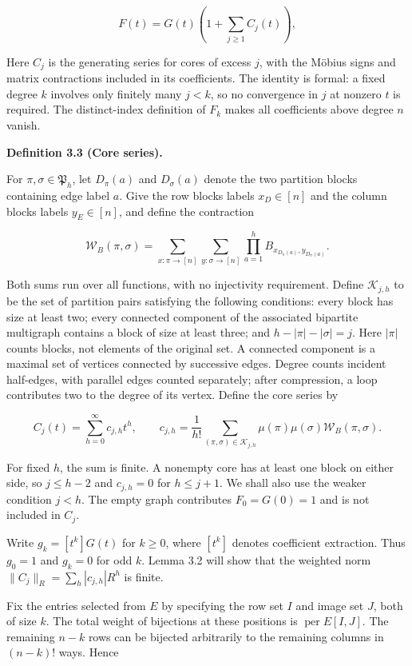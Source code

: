 \documentclass[11pt,a4paper]{article}
\begin{document}
\[
F(t)=G(t)\left(1+\sum_{j\ge1}C_j(t)\right),
\]

Here \(C_j\) is the generating series for cores of excess \(j\), with the Möbius signs and matrix contractions included in its coefficients. The identity is formal: a fixed degree \(k\) involves only finitely many \(j<k\), so no convergence in \(j\) at nonzero \(t\) is required. The distinct-index definition of \(F_k\) makes all coefficients above degree \(n\) vanish.

\textbf{Definition 3.3 (Core series).}

For \(\pi,\sigma\in\mathfrak P_h\), let \(D_\pi(a)\) and \(D_\sigma(a)\) denote the two partition blocks containing edge label \(a\). Give the row blocks labels \(x_D\in[n]\) and the column blocks labels \(y_E\in[n]\), and define the contraction

\[
\mathcal W_B(\pi,\sigma)
=\sum_{x:\pi\to[n]}\sum_{y:\sigma\to[n]}
\prod_{a=1}^hB_{x_{D_\pi(a)},y_{D_\sigma(a)}}.
\]

Both sums run over all functions, with no injectivity requirement. Define \(\mathcal K_{j,h}\) to be the set of partition pairs satisfying the following conditions: every block has size at least two; every connected component of the associated bipartite multigraph contains a block of size at least three; and \(h-|\pi|-|\sigma|=j\). Here \(|\pi|\) counts blocks, not elements of the original set. A connected component is a maximal set of vertices connected by successive edges. Degree counts incident half-edges, with parallel edges counted separately; after compression, a loop contributes two to the degree of its vertex. Define the core series by

\[
C_j(t)=\sum_{h=0}^{\infty}c_{j,h}t^h,\qquad
c_{j,h}=\frac1{h!}\sum_{(\pi,\sigma)\in\mathcal K_{j,h}}
\mu(\pi)\mu(\sigma)\mathcal W_B(\pi,\sigma).
\]

For fixed \(h\), the sum is finite. A nonempty core has at least one block on either side, so \(j\le h-2\) and \(c_{j,h}=0\) for \(h\le j+1\). We shall also use the weaker condition \(j<h\). The empty graph contributes \(F_0=G(0)=1\) and is not included in \(C_j\).

Write \(g_k=[t^k]G(t)\) for \(k\ge0\), where \([t^k]\) denotes coefficient extraction. Thus \(g_0=1\) and \(g_k=0\) for odd \(k\). Lemma 3.2 will show that the weighted norm \(\|C_j\|_R=\sum_h|c_{j,h}|R^h\) is finite.

Fix the entries selected from \(E\) by specifying the row set \(I\) and image set \(J\), both of size \(k\). The total weight of bijections at these positions is \(\operatorname{per}E[I,J]\). The remaining \(n-k\) rows can be bijected arbitrarily to the remaining columns in \((n-k)!\) ways. Hence
\end{document}
